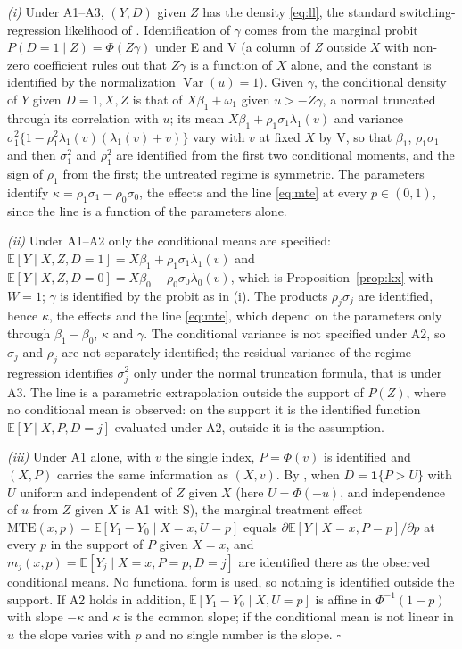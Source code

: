 \documentclass[11pt,a4paper]{article}
\theoremstyle{plain}
\theoremstyle{definition}
\theoremstyle{remark}
\newcommand{\E}{\mathbb{E}}
\newcommand{\Var}{\operatorname{Var}}
\newcommand{\MTE}{\mathrm{MTE}}
\newcommand{\1}{\mathbf{1}}
\begin{document}
\emph{(i)} Under A1--A3, $(Y,D)$ given $Z$ has the density
\eqref{eq:ll}, the standard switching-regression likelihood of
\citet[p.~224]{maddala1983}. Identification of $\gamma$ comes from the
marginal probit $P(D=1\mid Z)=\Phi(Z\gamma)$ under E and V (a column of
$Z$ outside $X$ with non-zero coefficient rules out that $Z\gamma$ is a
function of $X$ alone, and the constant is identified by the normalization
$\Var(u)=1$). Given $\gamma$, the conditional density of $Y$ given
$D=1,X,Z$ is that of $X\beta_1+\omega_1$ given $u>-Z\gamma$, a normal
truncated through its correlation with $u$; its mean
$X\beta_1+\rho_1\sigma_1\lambda_1(v)$ and variance
$\sigma_1^2\{1-\rho_1^2\lambda_1(v)(\lambda_1(v)+v)\}$ vary with $v$ at
fixed $X$ by V, so that $\beta_1$, $\rho_1\sigma_1$ and then $\sigma_1^2$
and $\rho_1^2$ are identified from the first two conditional moments, and
the sign of $\rho_1$ from the first; the untreated regime is symmetric.
The parameters identify $\kappa=\rho_1\sigma_1-\rho_0\sigma_0$, the
effects and the line \eqref{eq:mte} at every $p\in(0,1)$, since the line
is a function of the parameters alone.

\emph{(ii)} Under A1--A2 only the conditional means are specified:
$\E[Y\mid X,Z,D=1]=X\beta_1+\rho_1\sigma_1\lambda_1(v)$ and
$\E[Y\mid X,Z,D=0]=X\beta_0-\rho_0\sigma_0\lambda_0(v)$, which is
Proposition~\ref{prop:kx} with $W=1$; $\gamma$ is identified by the
probit as in (i). The products $\rho_j\sigma_j$ are identified, hence
$\kappa$, the effects and the line \eqref{eq:mte}, which depend on the
parameters only through $\beta_1-\beta_0$, $\kappa$ and $\gamma$. The
conditional variance is not specified under A2, so $\sigma_j$ and
$\rho_j$ are not separately identified; the residual variance of the
regime regression identifies $\sigma_j^2$ only under the normal
truncation formula, that is under A3. The line is a parametric
extrapolation outside the support of $P(Z)$, where no conditional mean
is observed: on the support it is the identified function
$\E[Y\mid X,P,D=j]$ evaluated under A2, outside it is the assumption.

\emph{(iii)} Under A1 alone, with $v$ the single index, $P=\Phi(v)$ is
identified and $(X,P)$ carries the same information as $(X,v)$. By
\citet[Theorem~1]{heckman2005}, when $D=\1\{P>U\}$ with $U$ uniform and
independent of $Z$ given $X$ (here $U=\Phi(-u)$, and independence of
$u$ from $Z$ given $X$ is A1 with S), the marginal treatment effect
$\MTE(x,p)=\E[Y_1-Y_0\mid X=x,U=p]$ equals $\partial\E[Y\mid X=x,P=p]/\partial p$
at every $p$ in the support of $P$ given $X=x$, and
$m_j(x,p)=\E[Y_j\mid X=x,P=p,D=j]$ are identified there as the observed
conditional means. No functional form is used, so nothing is identified
outside the support. If A2 holds in addition, $\E[Y_1-Y_0\mid X,U=p]$ is
affine in $\Phi^{-1}(1-p)$ with slope $-\kappa$ and $\kappa$ is the
common slope; if the conditional mean is not linear in $u$ the slope
varies with $p$ and no single number is the slope. \hfill$\square$
\end{document}
